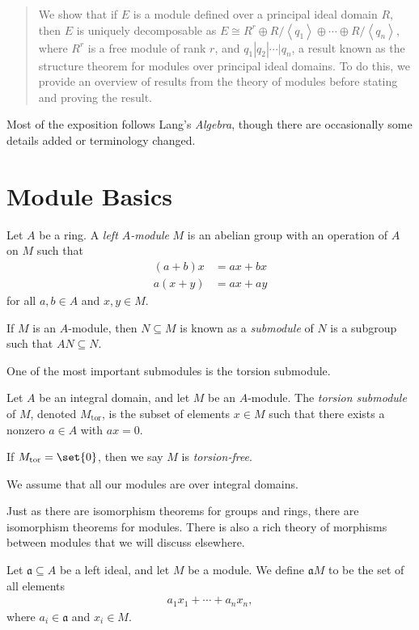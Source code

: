 \documentclass[10pt]{mypackage}
\DeclareMathOperator{\tor}{tor}
\begin{document}
\RaggedRight
\begin{abstract}
  \noindent We show that if $E$ is a module defined over a principal ideal domain $R$, then $E$ is uniquely decomposable as $E \cong R^{r}\oplus R/\left\langle q_1 \right\rangle\oplus \cdots \oplus R/\left\langle q_n \right\rangle$, where $R^{r}$ is a free module of rank $r$, and $q_1 | q_2 | \cdots | q_n$, a result known as the structure theorem for modules over principal ideal domains. To do this, we provide an overview of results from the theory of modules before stating and proving the result.
\end{abstract}
Most of the exposition follows Lang's \textit{Algebra}, though there are occasionally some details added or terminology changed.
\section{Module Basics}%
\begin{definition}
  Let $A$ be a ring. A \textit{left $A$-module} $M$ is an abelian group with an operation of $A$ on $M$ such that
  \begin{align*}
    \left( a + b \right)x &= ax + bx\\
    a\left( x + y \right) &= ax + ay
  \end{align*}
  for all $a,b\in A$ and $x,y\in M$.\newline

  If $M$ is an $A$-module, then $N\subseteq M$ is known as a \textit{submodule} of $N$ is a subgroup such that $AN \subseteq N$.
\end{definition}
One of the most important submodules is the torsion submodule.
\begin{definition}
  Let $A$ be an integral domain, and let $M$ be an $A$-module. The \textit{torsion submodule} of $M$, denoted $M_{\tor}$, is the subset of elements $x\in M$ such that there exists a nonzero $a\in A$ with $ax = 0$.\newline

  If $M_{\tor} = \set{0}$, then we say $M$ is \textit{torsion-free}.
\end{definition}
We assume that all our modules are over integral domains.\newline

Just as there are isomorphism theorems for groups and rings, there are isomorphism theorems for modules. There is also a rich theory of morphisms between modules that we will discuss elsewhere.
\begin{definition}
  Let $\mathfrak{a}\subseteq A$ be a left ideal, and let $M$ be a module. We define $\mathfrak{a}M$ to be the set of all elements
  \begin{align*}
    a_1x_1 + \cdots + a_nx_n,
  \end{align*}
  where $a_i\in \mathfrak{a}$ and $x_i\in M$.
\end{definition}
\end{document}
